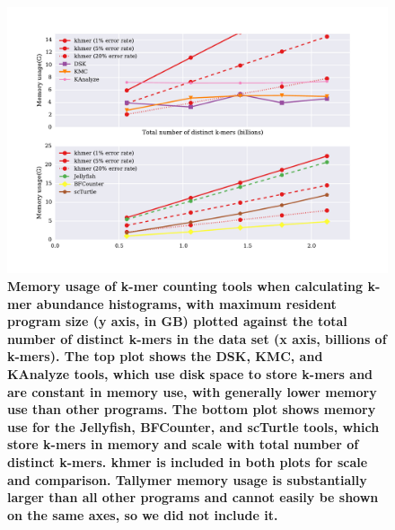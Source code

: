 \documentclass[10pt]{article}
\begin{document}
\begin{figure}[!ht]
\centerline{\includegraphics[width=5in]{./figure/memory_benchmark}}

\caption{\bf Memory usage of k-mer counting tools when calculating
  k-mer abundance histograms, with maximum resident program size (y
  axis, in GB) plotted against the total number of distinct k-mers in
  the data set (x axis, billions of k-mers). The top plot shows the
  DSK, KMC, and KAnalyze tools, which use disk space to store k-mers
  and are constant in memory use, with generally lower memory use than
  other programs.  The bottom plot shows memory use for the Jellyfish,
  BFCounter, and scTurtle tools, which store k-mers in memory and
  scale with total number of distinct k-mers.  khmer is included in
  both plots for scale and comparison. Tallymer memory usage is
  substantially larger than all other programs and cannot easily be
  shown on the same axes, so we did not include it.}

\label{fig:cmp_memory}
\end{figure}
\end{document}
